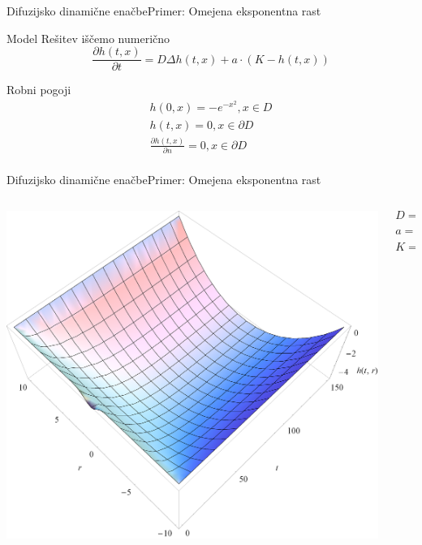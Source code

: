 \documentclass{beamer}
\begin{document}
\begin{frame}{Difuzijsko dinamične enačbe}{Primer: Omejena eksponentna rast}
\begin{block}{Model}
  Rešitev iščemo numerično
  \begin{equation} \frac{ \partial h(t,x) }{ \partial t} = D \Delta h(t,x) + a \cdot (K - h(t,x)) \end{equation} 
\end{block}
\begin{block}{Robni pogoji}
        \begin{equation}
          \begin{aligned}
            h(0,x) =  - e^{-x^2}, x \in D \\
            h(t,x) = 0, x \in \partial D \\
            \frac{\partial h(t,x)}{\partial n} = 0, x \in \partial D \\
          \end{aligned}
        \end{equation}
\end{block}
\end{frame}

\begin{frame}{Difuzijsko dinamične enačbe}{Primer:  Omejena eksponentna rast}
\begin{columns}
  \begin{column}{0.8\textwidth}
    \includegraphics[width=1.05\textwidth]{slike/difuzija-omejena-eksponentna-rast2.png}
  \end{column}
  \begin{column}{0.3\textwidth}
    \footnotesize
    \[ D = 1 \]
    \[ a = \frac{1}{50} \]
    \[ K = -10 \]
  \end{column}
\end{columns}
\end{frame}
\end{document}
